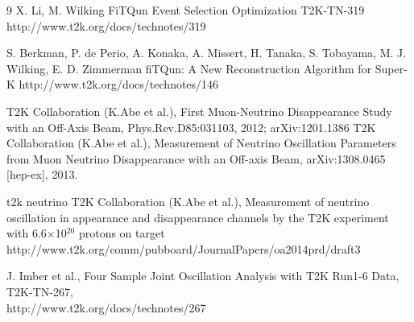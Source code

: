 \begin{thebibliography}{9}
  X. Li, M. Wilking
  FiTQun Event Selection Optimization
  T2K-TN-319
  http://www.t2k.org/docs/technotes/319

  S. Berkman, P. de Perio, A. Konaka, A. Missert, H. Tanaka, S. Tobayama, M. J. Wilking, E. D. Zimmerman
  fiTQun: A New Reconstruction Algorithm for Super-K
  http://www.t2k.org/docs/technotes/146

%
%
   T2K Collaboration (K.Abe et al.), 
   First Muon-Neutrino Disappearance Study with an Off-Axis Beam,
   Phys.Rev.D85:031103, 2012; arXiv:1201.1386
  T2K Collaboration (K.Abe et al.),
  Measurement of Neutrino Oscillation Parameters from Muon Neutrino Disappearance with an Off-axis Beam,
  arXiv:1308.0465 [hep-ex], 2013.
  
%
%
t2k neutrino
   T2K Collaboration (K.Abe et al.),
   Measurement of neutrino oscillation in appearance and disappearance channels by the T2K experiment with 
   6.6$\times$10$^{20}$ protons on target 
   http://www.t2k.org/comm/pubboard/JournalPapers/oa2014prd/draft3

%
%
J. Imber et al.,
Four Sample Joint Oscillation Analysis with T2K Run1-6 Data,
  T2K-TN-267,\\
 http://www.t2k.org/docs/technotes/267


\end{thebibliography}
